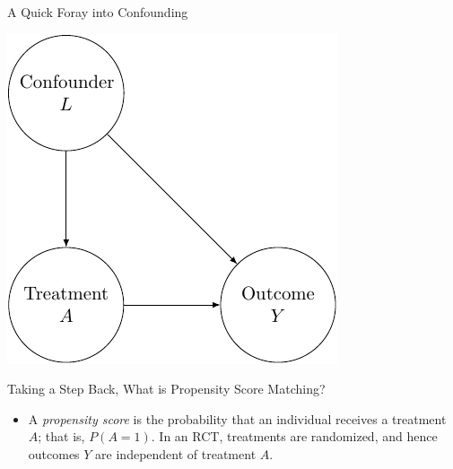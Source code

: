 \documentclass[
  ignorenonframetext,
]{beamer}
\providecommand{\tightlist}{%
  \setlength{\itemsep}{0pt}\setlength{\parskip}{0pt}}
\begin{document}
\begin{frame}{A Quick Foray into Confounding}
\protect\hypertarget{a-quick-foray-into-confounding}{}

\includegraphics{pres_draft_jimmy_files/figure-beamer/unnamed-chunk-1-1.pdf}

\end{frame}

\begin{frame}{Taking a Step Back, What is Propensity Score Matching?}
\protect\hypertarget{taking-a-step-back-what-is-propensity-score-matching}{}

\begin{itemize}[<+->]
\tightlist
\item
  A \emph{propensity score} is the probability that an individual
  receives a treatment \(A\); that is, \(P(A = 1)\). In an RCT,
  treatments are randomized, and hence outcomes \(Y\) are independent of
  treatment \(A\).
\end{itemize}

\end{frame}
\end{document}
